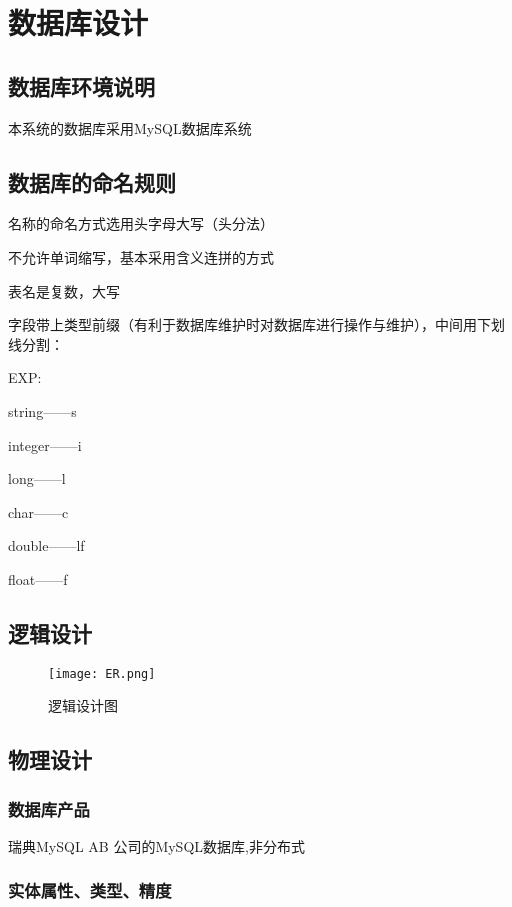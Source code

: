 \chapter{数据库设计}
\section{数据库环境说明}
本系统的数据库采用MySQL数据库系统

\section{数据库的命名规则}

名称的命名方式选用头字母大写（头分法）

不允许单词缩写，基本采用含义连拼的方式

表名是复数，大写

字段带上类型前缀（有利于数据库维护时对数据库进行操作与维护），中间用下划线分割：

EXP:

string——s

integer——i

long——l

char——c

double——lf

float——f

\section{逻辑设计}
\begin{figure}[H]
	\centering
	\texttt{[image: ER.png]}
	\caption{逻辑设计图} 
	\label{fig:figure8er}
\end{figure}


\section{物理设计}
\subsection{数据库产品}
瑞典MySQL AB 公司的MySQL数据库,非分布式

\subsection{实体属性、类型、精度}



